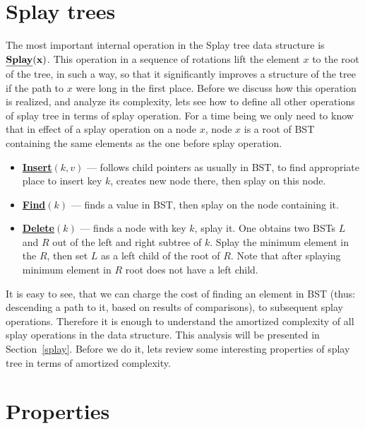 \documentclass[11pt]{article}
\begin{document}
\section{Splay trees}
The most important internal operation in the Splay tree data structure is ${\bf \underline{Splay}(x)}$. This operation in a sequence of rotations lift the element $x$ to the root of the tree, in such a way, so that it significantly improves a structure of the tree if the path to $x$ were long in the first place. Before we discuss how this operation is realized, and analyze its complexity, lets see how to define all other operations of splay tree in terms of splay operation. For a time being we only need to know that in effect of a splay operation on a node $x$, node $x$ is a root of BST containing the same elements as the one before splay operation.
\begin{itemize}
	\item {\bf \underline{Insert}$(k, v)$} --- follows child pointers as usually in BST, to find appropriate place to insert key $k$, creates new node there, then splay on this node.
	\item {\bf \underline{Find}$(k)$} --- finds a value in BST, then splay on the node containing it.
	\item {\bf \underline{Delete}$(k)$} --- finds a node with key $k$, splay it. One obtains two BSTs $L$ and $R$ out of the left and right subtree of $k$. Splay the minimum element in the $R$, then set $L$ as a left child of the root of $R$. Note that after splaying minimum element in $R$ root does not have a left child.
\end{itemize}

It is easy to see, that we can charge the cost of finding an element in BST (thus: descending a path to it, based on results of comparisons), to subsequent splay operations. Therefore it is enough to understand the amortized complexity of all splay operations in the data structure. This analysis will be presented in Section~\ref{splay}. Before we do it, lets review some interesting properties of splay tree in terms of amortized complexity.
\section{Properties}
\label{Properties}
\end{document}

